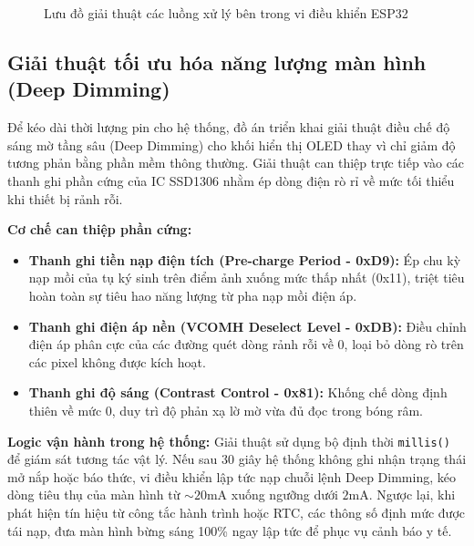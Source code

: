 \documentclass[12pt, a4paper, oneside]{article}
\begin{document}
\begin{figure}[H]
    \caption{Lưu đồ giải thuật các luồng xử lý bên trong vi điều khiển ESP32}
    \label{fig:luu_do_loop}
\end{figure}

\subsection{Giải thuật tối ưu hóa năng lượng màn hình (Deep Dimming)}
Để kéo dài thời lượng pin cho hệ thống, đồ án triển khai giải thuật điều chế độ sáng mờ tầng sâu (Deep Dimming) cho khối hiển thị OLED thay vì chỉ giảm độ tương phản bằng phần mềm thông thường. Giải thuật can thiệp trực tiếp vào các thanh ghi phần cứng của IC SSD1306 nhằm ép dòng điện rò rỉ về mức tối thiểu khi thiết bị rảnh rỗi.

\textbf{Cơ chế can thiệp phần cứng:}
\begin{itemize}
    \item \textbf{Thanh ghi tiền nạp điện tích (Pre-charge Period - 0xD9):} Ép chu kỳ nạp mồi của tụ ký sinh trên điểm ảnh xuống mức thấp nhất (0x11), triệt tiêu hoàn toàn sự tiêu hao năng lượng từ pha nạp mồi điện áp.
    \item \textbf{Thanh ghi điện áp nền (VCOMH Deselect Level - 0xDB):} Điều chỉnh điện áp phân cực của các đường quét dòng rảnh rỗi về 0, loại bỏ dòng rò trên các pixel không được kích hoạt.
    \item \textbf{Thanh ghi độ sáng (Contrast Control - 0x81):} Khống chế dòng định thiên về mức 0, duy trì độ phản xạ lờ mờ vừa đủ đọc trong bóng râm.
\end{itemize}

\textbf{Logic vận hành trong hệ thống:}
Giải thuật sử dụng bộ định thời \texttt{millis()} để giám sát tương tác vật lý. Nếu sau 30 giây hệ thống không ghi nhận trạng thái mở nắp hoặc báo thức, vi điều khiển lập tức nạp chuỗi lệnh Deep Dimming, kéo dòng tiêu thụ của màn hình từ $\sim 20$mA xuống ngưỡng dưới $2$mA. Ngược lại, khi phát hiện tín hiệu từ công tắc hành trình hoặc RTC, các thông số định mức được tái nạp, đưa màn hình bừng sáng 100\% ngay lập tức để phục vụ cảnh báo y tế.
\end{document}

